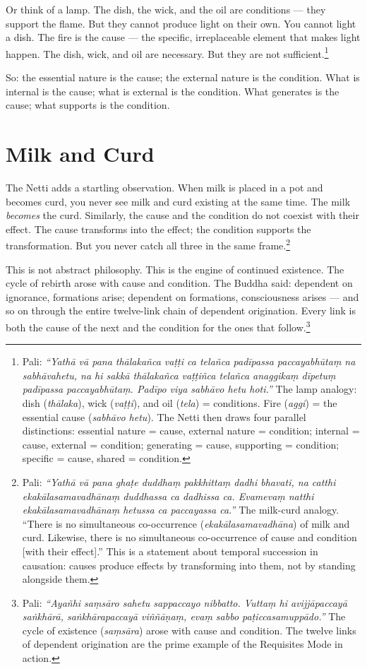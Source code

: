 Or think of a lamp. The dish, the wick, and the oil are conditions --- they support the flame. But they cannot produce light on their own. You cannot light a dish. The fire is the cause --- the specific, irreplaceable element that makes light happen. The dish, wick, and oil are necessary. But they are not sufficient.\footnote{Pali: \textit{``Yathā vā pana thālakañca vaṭṭi ca telañca padīpassa paccayabhūtaṃ na sabhāvahetu, na hi sakkā thālakañca vaṭṭiñca telañca anaggikaṃ dīpetuṃ padīpassa paccayabhūtaṃ. Padīpo viya sabhāvo hetu hoti.''} The lamp analogy: dish (\textit{thālaka}), wick (\textit{vaṭṭi}), and oil (\textit{tela}) = conditions. Fire (\textit{aggi}) = the essential cause (\textit{sabhāvo hetu}). The Netti then draws four parallel distinctions: essential nature = cause, external nature = condition; internal = cause, external = condition; generating = cause, supporting = condition; specific = cause, shared = condition.}

So: the essential nature is the cause; the external nature is the condition. What is internal is the cause; what is external is the condition. What generates is the cause; what supports is the condition.

\section*{Milk and Curd}

The Netti adds a startling observation. When milk is placed in a pot and becomes curd, you never see milk and curd existing at the same time. The milk \textit{becomes} the curd. Similarly, the cause and the condition do not coexist with their effect. The cause transforms into the effect; the condition supports the transformation. But you never catch all three in the same frame.\footnote{Pali: \textit{``Yathā vā pana ghaṭe duddhaṃ pakkhittaṃ dadhi bhavati, na catthi ekakālasamavadhānaṃ duddhassa ca dadhissa ca. Evamevaṃ natthi ekakālasamavadhānaṃ hetussa ca paccayassa ca.''} The milk-curd analogy. ``There is no simultaneous co-occurrence (\textit{ekakālasamavadhāna}) of milk and curd. Likewise, there is no simultaneous co-occurrence of cause and condition [with their effect].'' This is a statement about temporal succession in causation: causes produce effects by transforming into them, not by standing alongside them.}

This is not abstract philosophy. This is the engine of continued existence. The cycle of rebirth arose with cause and condition. The Buddha said: dependent on ignorance, formations arise; dependent on formations, consciousness arises --- and so on through the entire twelve-link chain of dependent origination. Every link is both the cause of the next and the condition for the ones that follow.\footnote{Pali: \textit{``Ayañhi saṃsāro sahetu sappaccayo nibbatto. Vuttaṃ hi avijjāpaccayā saṅkhārā, saṅkhārapaccayā viññāṇaṃ, evaṃ sabbo paṭiccasamuppādo.''} The cycle of existence (\textit{saṃsāra}) arose with cause and condition. The twelve links of dependent origination are the prime example of the Requisites Mode in action.}

